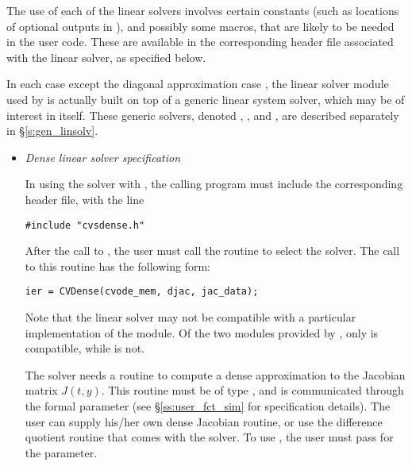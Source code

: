 The use of each of the linear solvers involves certain constants (such
as locations of optional outputs in ), and possibly some
macros, that are likely to be needed in the user code.  These are
available in the corresponding header file associated with the linear
solver, as specified below.

In each case except the diagonal approximation case {\cvdiag}, the linear
solver module used by {\cvodes} is actually built on top of a generic
linear system solver, which may be of interest in itself.  These
generic solvers, denoted {\dense}, {\band}, and {\spgmr}, are described
separately in \S\ref{s:gen_linsolv}.
%
\begin{itemize}
%
%
\item {\em Dense linear solver specification} 

  In using the {\cvdense} solver with {\cvodes}, the calling program must
  include the corresponding header file, with the line
\begin{verbatim}
#include "cvsdense.h"
\end{verbatim}
  \par After the call to , the user must call the routine 
  to select the {\cvdense} solver. The call to this routine has the following form:
\begin{verbatim}
ier = CVDense(cvode_mem, djac, jac_data);
\end{verbatim}

  Note that the {\cvdense} linear solver may not be compatible with a particular
  implementation of the {\nvector} module. Of the two {\nvector} modules 
  provided by {\sundials}, only {\nvecs} is compatible, while {\nvecp} is not.

  The 
  {\cvdense} solver needs a routine to compute a dense approximation to
  the Jacobian matrix $J(t,y)$.  This routine must be of type
  , and is communicated through the  
  formal parameter  (see \S\ref{ss:user_fct_sim} for specification
  details).  The user can supply his/her own dense
  Jacobian routine, or use the difference quotient routine  
  that comes with the {\cvdense} solver.  To use , the user 
  must pass  for the  parameter.
  

\end{itemize}
